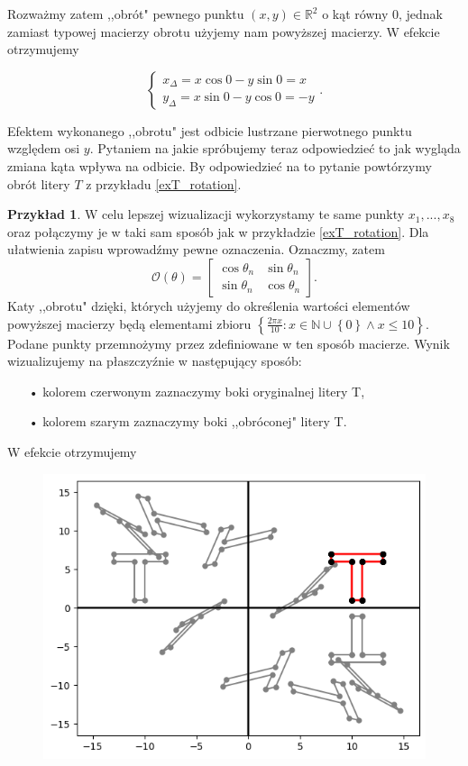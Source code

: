 \documentclass[a4paper,twoside,11pt,reqno]{mwrep}
\theoremstyle{plain} \newtheorem{twr}{Twierdzenie}
\theoremstyle{plain} \newtheorem{lem}{Lemat}
\theoremstyle{definition} \newtheorem{defi}{Definicja}
\theoremstyle{remark} \newtheorem*{wni}{Wniosek}
\theoremstyle{definition} \newtheorem{uwaga}{Uwaga}
\theoremstyle{definition}\newtheorem{prz}{Przykład}
\begin{document}
Rozważmy zatem ,,obrót" pewnego punktu $(x,y)\in\mathbb{R}^2$ o kąt równy $0$, jednak zamiast typowej macierzy obrotu użyjemy nam powyższej macierzy. W efekcie otrzymujemy 

$$\left\{\begin{array}{l}
x_\Delta = x \cos 0 - y\sin 0 =x\\
y_\Delta = x \sin 0 - y\cos 0 = -y
\end{array} \right. . $$

Efektem wykonanego ,,obrotu" jest odbicie lustrzane pierwotnego punktu względem osi $y$.
Pytaniem na jakie spróbujemy teraz odpowiedzieć to jak wygląda zmiana kąta wpływa na odbicie. 
By odpowiedzieć na to pytanie powtórzymy obrót litery $T$ z przykładu \ref{exT_rotation}.
\begin{prz}
W celu lepszej wizualizacji wykorzystamy te same punkty $x_1,...,x_8$ oraz połączymy je w taki sam sposób
jak w przykładzie  \ref{exT_rotation}. Dla ułatwienia zapisu wprowadźmy pewne oznaczenia. 
Oznaczmy, zatem
$$\mathcal{O}(\theta) =\begin{bmatrix}
\cos\theta_n&\sin\theta_n \\
\sin\theta_n & \cos\theta_n
\end{bmatrix}.$$
Katy ,,obrotu" dzięki, których użyjemy do określenia wartości elementów powyższej macierzy
będą elementami zbioru $\left\{\frac{2\pi x}{10}: x\in\mathbb{N}\cup\left\{ 0 \right\} \wedge x\leqslant10 \right\}$. Podane punkty przemnożymy przez zdefiniowane w ten sposób macierze.
Wynik wizualizujemy na płaszczyźnie w następujący sposób:
\begin{itemize}
\item[•] kolorem czerwonym zaznaczymy boki oryginalnej litery T,
\item[•] kolorem szarym zaznaczymy boki ,,obróconej" litery T.
\end{itemize}
W efekcie otrzymujemy  
\begin{figure}[h]
\begin{center}
\includegraphics[width=7 cm]{T-reflection.png}

\end{center}
\end{figure}
\end{prz}
\end{document}
